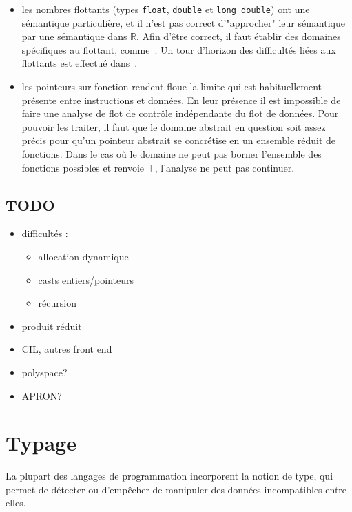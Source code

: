 \begin{itemize}
\item les nombres flottants
(types \texttt{float}, \texttt{double} et \texttt{long double}) ont une
sémantique particulière, et il n'est pas correct d'"approcher" leur sémantique
par une sémantique dans $ℝ$. Afin d'être correct, il faut établir des domaines
spécifiques au flottant, comme~\cite{floatpoly}. Un tour d'horizon des
difficultés liées aux flottants est effectué dans~\cite{floatpitfalls}.

\item les pointeurs sur fonction
rendent floue la limite qui est habituellement présente entre instructions et
données. En leur présence il est impossible de faire une analyse de flot de
contrôle indépendante du flot de données. Pour pouvoir les traiter, il faut que
le domaine abstrait en question soit assez précis pour qu'un pointeur abstrait
se concrétise en un ensemble réduit de fonctions. Dans le cas où le domaine ne
peut pas borner l'ensemble des fonctions possibles et renvoie $\top$, l'analyse
ne peut pas continuer.

\end{itemize}

\subsection*{TODO}

\begin{itemize}
\item difficultés :

\begin{itemize}
\item
  allocation dynamique
\item
  casts entiers/pointeurs
\item
  récursion
\end{itemize}

\item produit réduit
\item CIL, autres front end
\item polyspace?
\item APRON?
\end{itemize}

\section{Typage}

La plupart des langages de programmation incorporent la notion de type, qui
permet de détecter ou d'empêcher de manipuler des données incompatibles entre
elles.


